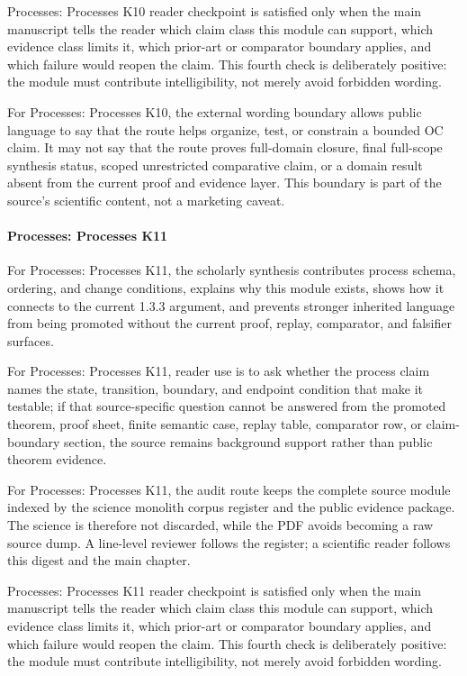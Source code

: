 Processes: Processes K10 reader checkpoint is satisfied only when the main manuscript tells the reader which claim class this module can support, which evidence class limits it, which prior-art or comparator boundary applies, and which failure would reopen the claim. This fourth check is deliberately positive: the module must contribute intelligibility, not merely avoid forbidden wording.


For Processes: Processes K10, the external wording boundary allows public language to say that the route helps organize, test, or constrain a bounded OC claim. It may not say that the route proves full-domain closure, final full-scope synthesis status, scoped unrestricted comparative claim, or a domain result absent from the current proof and evidence layer. This boundary is part of the source's scientific content, not a marketing caveat.


\paragraph{Processes: Processes K11}

For Processes: Processes K11, the scholarly synthesis contributes process schema, ordering, and change conditions, explains why this module exists, shows how it connects to the current 1.3.3 argument, and prevents stronger inherited language from being promoted without the current proof, replay, comparator, and falsifier surfaces.


For Processes: Processes K11, reader use is to ask whether the process claim names the state, transition, boundary, and endpoint condition that make it testable; if that source-specific question cannot be answered from the promoted theorem, proof sheet, finite semantic case, replay table, comparator row, or claim-boundary section, the source remains background support rather than public theorem evidence.


For Processes: Processes K11, the audit route keeps the complete source module indexed by the science monolith corpus register and the public evidence package. The science is therefore not discarded, while the PDF avoids becoming a raw source dump. A line-level reviewer follows the register; a scientific reader follows this digest and the main chapter.


Processes: Processes K11 reader checkpoint is satisfied only when the main manuscript tells the reader which claim class this module can support, which evidence class limits it, which prior-art or comparator boundary applies, and which failure would reopen the claim. This fourth check is deliberately positive: the module must contribute intelligibility, not merely avoid forbidden wording.


